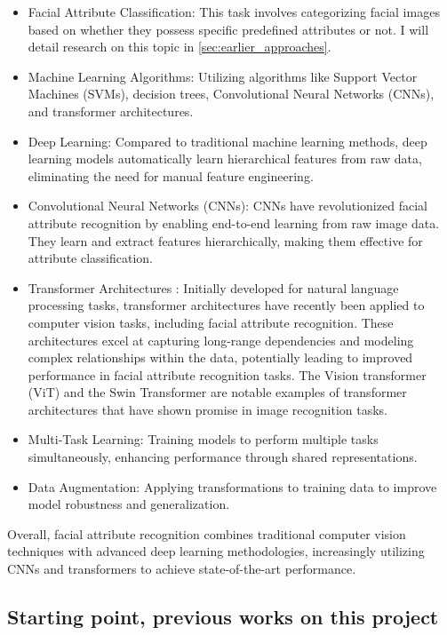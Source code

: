\documentclass[a4paper,oneside]{article}
\begin{document}
\begin{itemize}
    \itemsep0em 
  \item Facial Attribute Classification: This task involves categorizing facial images based on whether they possess specific predefined attributes or not. I will detail research on this topic in \ref{sec:earlier_approaches}.
  \item Machine Learning Algorithms: Utilizing algorithms like Support Vector Machines (SVMs), decision trees, Convolutional Neural Networks (CNNs), and transformer architectures.
  \item Deep Learning: Compared to traditional machine learning methods, deep learning models automatically learn hierarchical features from raw data, eliminating the need for manual feature engineering.
  \item Convolutional Neural Networks \citet{DBLP:journals/corr/OSheaN15} (CNNs): CNNs have revolutionized facial attribute recognition by enabling end-to-end learning from raw image data. They learn and extract features hierarchically, making them effective for attribute classification. 
  \item Transformer Architectures \citet{DBLP:journals/corr/VaswaniSPUJGKP17}: Initially developed for natural language processing tasks, transformer architectures have recently been applied to computer vision tasks, including facial attribute recognition. These architectures excel at capturing long-range dependencies and modeling complex relationships within the data, potentially leading to improved performance in facial attribute recognition tasks.
  The Vision transformer (ViT) \citet{DBLP:journals/corr/abs-2010-11929} and the Swin Transformer \citet{DBLP:journals/corr/abs-2103-14030} are notable examples of transformer architectures that have shown promise in image recognition tasks.
  \item Multi-Task Learning: Training models to perform multiple tasks simultaneously, enhancing performance through shared representations.
  \item Data Augmentation: Applying transformations to training data to improve model robustness and generalization.
\end{itemize}


Overall, facial attribute recognition combines traditional computer vision techniques with advanced deep learning methodologies, increasingly utilizing CNNs and transformers to achieve state-of-the-art performance.

\subsection{Starting point, previous works on this project}
\label{sec:prev_works}
\end{document}
